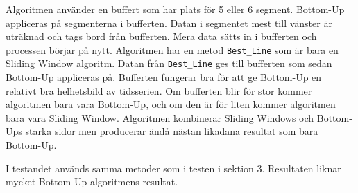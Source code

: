 \documentclass{article}
\begin{document}
Algoritmen använder en buffert som har plats för 5 eller 6 segment. Bottom-Up appliceras på segmenterna i bufferten. Datan i segmentet mest till vänster är uträknad och tags bord från bufferten. Mera data sätts in i bufferten och processen börjar på nytt. Algoritmen har en metod \texttt{Best_Line} som är bara en Sliding Window algoritm. Datan från \texttt{Best_Line} ges till bufferten som sedan Bottom-Up appliceras på. Bufferten fungerar bra för att ge Bottom-Up en relativt bra helhetsbild av tidsserien. Om bufferten blir för stor kommer algoritmen bara vara Bottom-Up, och om den är för liten kommer algoritmen bara vara Sliding Window. Algoritmen kombinerar Sliding Windows och Bottom-Ups starka sidor men producerar ändå nästan likadana resultat som bara Bottom-Up.

I testandet används samma metoder som i testen i sektion 3. Resultaten liknar mycket Bottom-Up algoritmens resultat.
\end{document}
